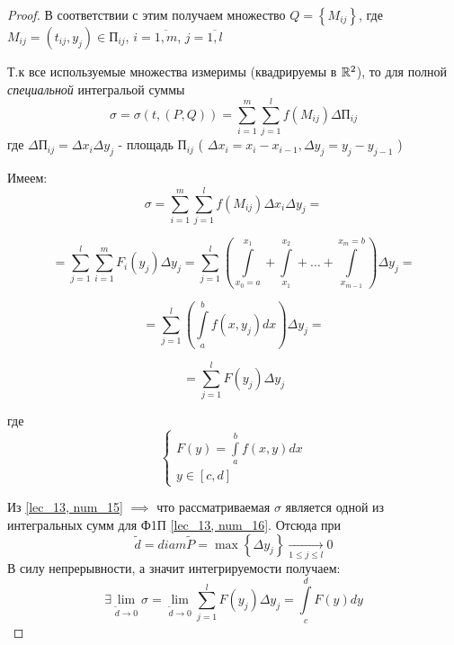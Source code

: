 \documentclass[../../main.tex]{subfiles}
\begin{document}
\begin{proof}
 	В соответствии с этим получаем множество $ Q = \left\lbrace M_{ij} \right\rbrace $,
 	где $ M_{ij} = \left( t_{ij}, y_j \right) \in \text{П}_{ij} $, $ i = \overline{1, m} $, 
 	$ j = \overline{1, l} $
 	
 	Т.к все используемые множества измеримы (квадрируемы в $ \mathbb{R}^2 $), 
 	то для полной \emph{специальной} интегральой суммы
 	\begin{equation}
 	\label{lec_13, num_14}
 	\sigma = \sigma \left( t, \left( P, Q \right) \right) = \sum\limits_{i = 1}^m 
 	\sum\limits_{j = 1}^l f \left( M_{ij} \right) \Delta \text{П}_{ij}
 	\end{equation}
 	где $\Delta \text{П}_{ij} = \Delta x_i \Delta y_j$ - площадь $\text{П}_{ij}$ 
 	( $ \Delta x_i = x_i - x_{i-1}, \Delta y_j = y_j - y_{j - 1} $ )
 	
 	Имеем:
 	\[ \sigma = \sum\limits_{i = 1}^m \sum\limits_{j = 1}^l f \left( M_{ij} \right) 
 	\Delta x_i \Delta y_j = \]
 	
 	\[ = \sum\limits_{j = 1}^l \sum\limits_{i = 1}^m F_i \left( y_j \right) \Delta y_j = 
 	\sum\limits_{j = 1}^l \left( 
 	\int\limits_{x_0 = a}^{ x_1 } + \int\limits_{x_1}^{ x_2 } + \dots + 
 	\int\limits_{ x_{m-1} }^{x_m = b} \right) \Delta y_j = \]
 	
 	\[ = \sum\limits_{j = 1}^l \left( \int\limits_a^b f \left( x, y_j\right) dx \right)
 	 \Delta y_j =  \]
 	
 	\begin{equation}
 	\label{lec_13, num_15}
 	= \sum\limits_{j = 1}^l F \left( y_j \right) \Delta y_j 
 	\end{equation}
 	
 	где
 	\begin{equation}
 	\label{lec_13, num_16}
 	\begin{cases}
 	F \left( y \right) = \int\limits_a^b f \left( x, y \right) dx \\
 	y \in \left[ c, d \right] 
 	\end{cases}
 	\end{equation}
 	
 	Из \eqref{lec_13, num_15} $ \implies $ что рассматриваемая $\sigma$
 	является одной из интегральных сумм для Ф1П  \eqref{lec_13, num_16}.
 	Отсюда при 
 	\[ \widetilde{d} = diam \widetilde{P} = 
 	\max \left\lbrace \Delta y_j \right\rbrace \underset{1 \leq j \leq l}{\longrightarrow} 0 \]
 	В силу непрерывности, а значит интегрируемости получаем: 
 	\[ \exists \lim\limits_{ \widetilde{d} \to 0 } \sigma = 
 	\lim\limits_{ \widetilde{d} \to 0 } \sum\limits_{j = 1}^l F \left( y_j \right) \Delta y_j =
 	\int\limits_c^d F \left( y \right)dy  \]
 	

\end{proof}
\end{document}
